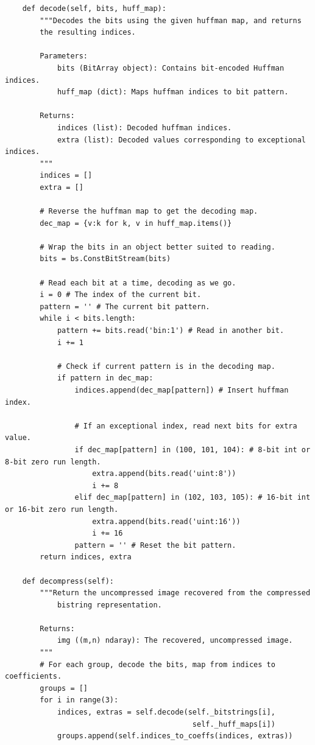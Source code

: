 \begin{lstlisting}
    def decode(self, bits, huff_map):
        """Decodes the bits using the given huffman map, and returns
        the resulting indices.

        Parameters:
            bits (BitArray object): Contains bit-encoded Huffman indices.
            huff_map (dict): Maps huffman indices to bit pattern.

        Returns:
            indices (list): Decoded huffman indices.
            extra (list): Decoded values corresponding to exceptional indices.
        """
        indices = []
        extra = []

        # Reverse the huffman map to get the decoding map.
        dec_map = {v:k for k, v in huff_map.items()}

        # Wrap the bits in an object better suited to reading.
        bits = bs.ConstBitStream(bits)

        # Read each bit at a time, decoding as we go.
        i = 0 # The index of the current bit.
        pattern = '' # The current bit pattern.
        while i < bits.length:
            pattern += bits.read('bin:1') # Read in another bit.
            i += 1

            # Check if current pattern is in the decoding map.
            if pattern in dec_map:
                indices.append(dec_map[pattern]) # Insert huffman index.

                # If an exceptional index, read next bits for extra value.
                if dec_map[pattern] in (100, 101, 104): # 8-bit int or 8-bit zero run length.
                    extra.append(bits.read('uint:8'))
                    i += 8
                elif dec_map[pattern] in (102, 103, 105): # 16-bit int or 16-bit zero run length.
                    extra.append(bits.read('uint:16'))
                    i += 16
                pattern = '' # Reset the bit pattern.
        return indices, extra

    def decompress(self):
        """Return the uncompressed image recovered from the compressed
            bistring representation.

        Returns:
            img ((m,n) ndaray): The recovered, uncompressed image.
        """
        # For each group, decode the bits, map from indices to coefficients.
        groups = []
        for i in range(3):
            indices, extras = self.decode(self._bitstrings[i],
                                           self._huff_maps[i])
            groups.append(self.indices_to_coeffs(indices, extras))


\end{lstlisting}
